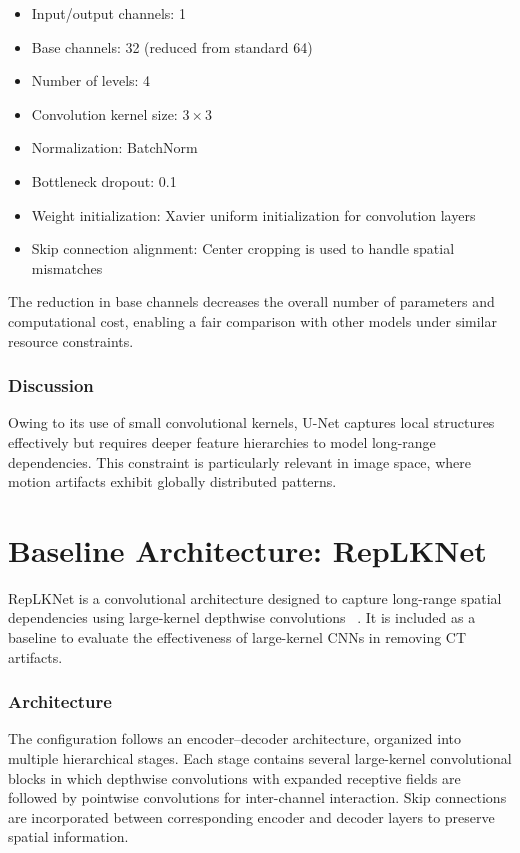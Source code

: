 \begin{itemize}
    \item Input/output channels: 1
    \item Base channels: 32 (reduced from standard 64)
    \item Number of levels: 4
    \item Convolution kernel size: $3 \times 3$
    \item Normalization: BatchNorm
    \item Bottleneck dropout: 0.1
    \item Weight initialization: Xavier uniform initialization for convolution layers 
    \item  Skip connection alignment: Center cropping is used to handle spatial mismatches 
\end{itemize}

The reduction in base channels decreases the overall number of parameters and computational cost, enabling a fair comparison with other models under similar resource constraints.

\subsubsection{Discussion}

Owing to its use of small convolutional kernels, U-Net captures local structures effectively but requires deeper feature hierarchies to model long-range dependencies. This constraint is particularly relevant in image space, where motion artifacts exhibit globally distributed patterns.

\section{Baseline Architecture: RepLKNet}

RepLKNet is a convolutional architecture designed to capture long-range spatial dependencies using large-kernel depthwise convolutions ~\cite{replknet2022}. It is included as a baseline to evaluate the effectiveness of large-kernel CNNs in removing CT artifacts.

\subsubsection{Architecture}

The configuration follows an encoder–decoder architecture, organized into multiple hierarchical stages. Each stage contains several large-kernel convolutional blocks in which depthwise convolutions with expanded receptive fields are followed by pointwise convolutions for inter-channel interaction.  Skip connections are incorporated between corresponding encoder and decoder layers to preserve spatial information. 

